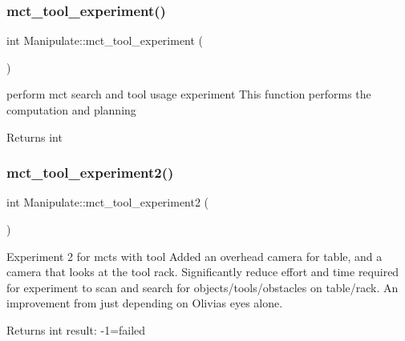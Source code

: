 \subsubsection{\texorpdfstring{mct\+\_\+tool\+\_\+experiment()}{mct\_tool\_experiment()}}
{\footnotesize\ttfamily int Manipulate\+::mct\+\_\+tool\+\_\+experiment (\begin{DoxyParamCaption}{ }\end{DoxyParamCaption})\hspace{0.3cm}{\ttfamily [private]}}



perform mct search and tool usage experiment This function performs the computation and planning 

\begin{DoxyReturn}{Returns}
int 
\end{DoxyReturn}
\mbox{\label{structManipulate_ad42c5cd9aaae7a12c0056fe4d78fcbf8}} 
\subsubsection{\texorpdfstring{mct\+\_\+tool\+\_\+experiment2()}{mct\_tool\_experiment2()}}
{\footnotesize\ttfamily int Manipulate\+::mct\+\_\+tool\+\_\+experiment2 (\begin{DoxyParamCaption}{ }\end{DoxyParamCaption})\hspace{0.3cm}{\ttfamily [private]}}



Experiment 2 for mcts with tool Added an overhead camera for table, and a camera that looks at the tool rack. Significantly reduce effort and time required for experiment to scan and search for objects/tools/obstacles on table/rack. An improvement from just depending on Olivia\textquotesingle{}s eyes alone. 

\begin{DoxyReturn}{Returns}
int result\+: -\/1=failed 
\end{DoxyReturn}
\mbox{\label{structManipulate_a11da86aa5653ed4e4ddf1fe25a169a7a}} 
